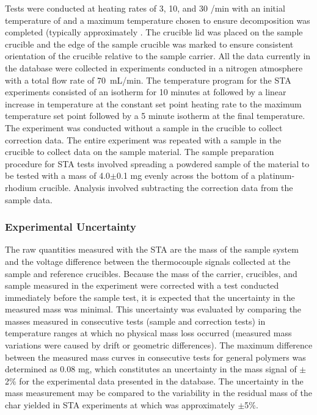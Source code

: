 \documentclass[12pt,oneside]{book}
\begin{document}
Tests were conducted at heating rates of 3, 10, and 30 \degC{}/min with an initial temperature of  and a maximum temperature chosen to ensure decomposition was completed (typically approximately . The crucible lid was placed on the sample crucible and the edge of the sample crucible was marked to ensure consistent orientation of the crucible relative to the sample carrier. All the data currently in the database were collected in experiments conducted in a nitrogen atmosphere with a total flow rate of 70~mL/min. The temperature program for the STA experiments consisted of an isotherm for 10 minutes at  followed by a linear increase in temperature at the constant set point heating rate to the maximum temperature set point followed by a 5 minute isotherm at the final temperature. The experiment was conducted without a sample in the crucible to collect correction data. The entire experiment was repeated with a sample in the crucible to collect data on the sample material. The sample preparation procedure for STA tests involved spreading a powdered sample of the material to be tested with a mass of 4.0$\pm$0.1 mg evenly across the bottom of a platinum-rhodium crucible. Analysis involved subtracting the correction data from the sample data. 

\subsubsection{Experimental Uncertainty}

The raw quantities measured with the STA are the mass of the sample system and the voltage difference between the thermocouple signals collected at the sample and reference crucibles. Because the mass of the carrier, crucibles, and sample measured in the experiment were corrected with a test conducted immediately before the sample test, it is expected that the uncertainty in the measured mass was minimal. This uncertainty was evaluated by comparing the masses measured in consecutive tests (sample and correction tests) in temperature ranges at which no physical mass loss occurred (measured mass variations were caused by drift or geometric differences). The maximum difference between the measured mass curves in consecutive tests for general polymers was determined as 0.08 mg, which constitutes an uncertainty in the mass signal of $\pm$2\% for the experimental data presented in the database. The uncertainty in the mass measurement may be compared to the variability in the residual mass of the char yielded in STA experiments at  which was approximately $\pm$5\%.
\end{document}

